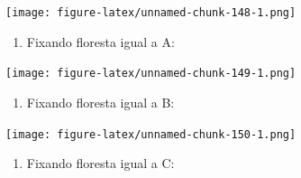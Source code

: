 \documentclass[
]{article}
\newenvironment{Shaded}{\begin{snugshade}}{\end{snugshade}}
\newcommand{\DataTypeTok}[1]{\textcolor[rgb]{0.13,0.29,0.53}{#1}}
\newcommand{\DecValTok}[1]{\textcolor[rgb]{0.00,0.00,0.81}{#1}}
\newcommand{\KeywordTok}[1]{\textcolor[rgb]{0.13,0.29,0.53}{\textbf{#1}}}
\newcommand{\NormalTok}[1]{#1}
\newcommand{\OperatorTok}[1]{\textcolor[rgb]{0.81,0.36,0.00}{\textbf{#1}}}
\newcommand{\StringTok}[1]{\textcolor[rgb]{0.31,0.60,0.02}{#1}}
\providecommand{\tightlist}{%
  \setlength{\itemsep}{0pt}\setlength{\parskip}{0pt}}
\begin{document}
\begin{Shaded}
\end{Shaded}

\texttt{[image: figure-latex/unnamed-chunk-148-1.png]}

\begin{enumerate}
\def\labelenumi{\arabic{enumi}.}
\setcounter{enumi}{6}
\tightlist
\item
  Fixando floresta igual a A:
\end{enumerate}

\begin{Shaded}
\end{Shaded}

\texttt{[image: figure-latex/unnamed-chunk-149-1.png]}

\begin{enumerate}
\def\labelenumi{\arabic{enumi}.}
\setcounter{enumi}{7}
\tightlist
\item
  Fixando floresta igual a B:
\end{enumerate}

\begin{Shaded}
\end{Shaded}

\texttt{[image: figure-latex/unnamed-chunk-150-1.png]}

\begin{enumerate}
\def\labelenumi{\arabic{enumi}.}
\setcounter{enumi}{8}
\tightlist
\item
  Fixando floresta igual a C:
\end{enumerate}
\end{document}
